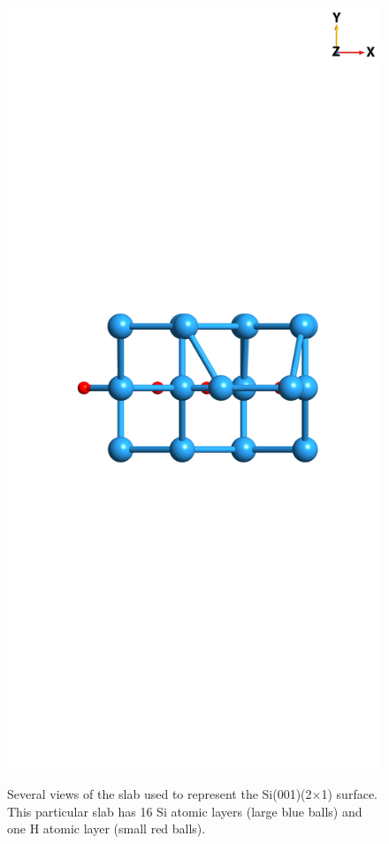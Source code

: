 {\begin{figure}
\begin{minipage}[b]{0.31\textwidth}
        \label{fig:2x1side}
    \end{minipage}
    \begin{minipage}[b]{0.31\textwidth}
        \centering
        \includegraphics[width=\textwidth]{content/figures/source/structure/Si2x1-top}
        \label{fig:2x1top}
    \end{minipage}
    \caption{Several views of the slab used to represent the Si(001)(2$\times$1)
    surface. This particular slab has 16 Si atomic layers (large blue balls) and
    one H atomic layer (small red balls).}
    \label{fig:2x1struc}
\end{figure}

}
